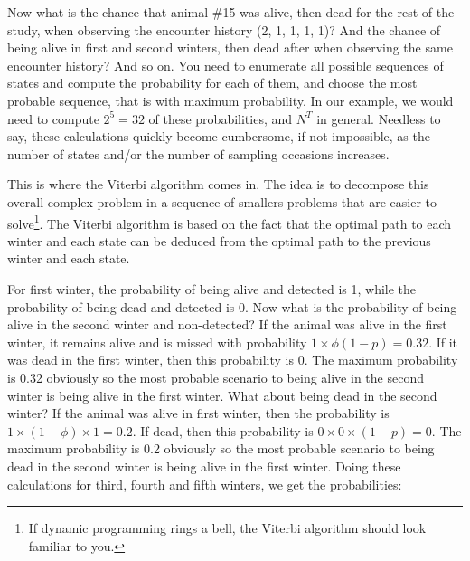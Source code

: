 \documentclass[
  12pt,
]{krantz}
\begin{document}
Now what is the chance that animal \#15 was alive, then dead for the rest of the study, when observing the encounter history (2, 1, 1, 1, 1)? And the chance of being alive in first and second winters, then dead after when observing the same encounter history? And so on. You need to enumerate all possible sequences of states and compute the probability for each of them, and choose the most probable sequence, that is with maximum probability. In our example, we would need to compute \(2^5 = 32\) of these probabilities, and \(N^T\) in general. Needless to say, these calculations quickly become cumbersome, if not impossible, as the number of states and/or the number of sampling occasions increases.

This is where the Viterbi algorithm comes in. The idea is to decompose this overall complex problem in a sequence of smallers problems that are easier to solve\footnote{If dynamic programming rings a bell, the Viterbi algorithm should look familiar to you.}. The Viterbi algorithm is based on the fact that the optimal path to each winter and each state can be deduced from the optimal path to the previous winter and each state.

For first winter, the probability of being alive and detected is 1, while the probability of being dead and detected is 0. Now what is the probability of being alive in the second winter and non-detected? If the animal was alive in the first winter, it remains alive and is missed with probability \(1 \times \phi (1-p) = 0.32\). If it was dead in the first winter, then this probability is 0. The maximum probability is 0.32 obviously so the most probable scenario to being alive in the second winter is being alive in the first winter. What about being dead in the second winter? If the animal was alive in first winter, then the probability is \(1 \times (1-\phi) \times 1 = 0.2\). If dead, then this probability is \(0 \times 0 \times (1-p) = 0\). The maximum probability is 0.2 obviously so the most probable scenario to being dead in the second winter is being alive in the first winter. Doing these calculations for third, fourth and fifth winters, we get the probabilities:
\end{document}
